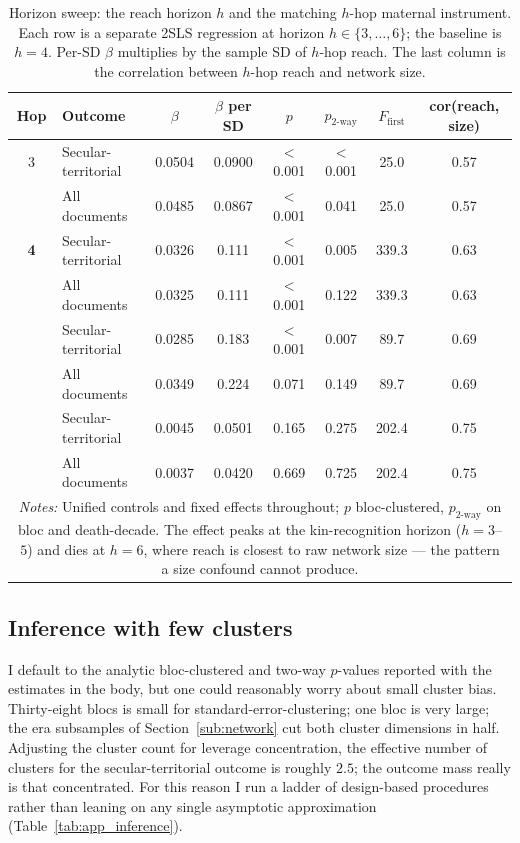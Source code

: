 \documentclass[12pt]{article}
\theoremstyle{definition}
\theoremstyle{remark}
\begin{document}
\begin{table}[t]
\centering
\caption{Horizon sweep: the reach horizon $h$ and the matching $h$-hop maternal instrument. Each row is a separate 2SLS regression at horizon $h\in\{3,\dots,6\}$; the baseline is $h=4$. Per-SD $\beta$ multiplies by the sample SD of $h$-hop reach. The last column is the correlation between $h$-hop reach and network size.}
\label{tab:app_hopsweep}
\begin{tabular}{clcccccc}
\toprule
Hop & Outcome & $\beta$ & $\beta$ per SD & $p$ & $p_{\text{2-way}}$ & $F_{\text{first}}$ & cor(reach, size) \\
\midrule
3 & Secular-territorial & 0.0504 & 0.0900 & $<$0.001 & $<$0.001 & 25.0 & 0.57 \\
 & All documents & 0.0485 & 0.0867 & $<$0.001 & 0.041 & 25.0 & 0.57 \\
\addlinespace
\textbf{4} & Secular-territorial & 0.0326 & 0.111 & $<$0.001 & 0.005 & 339.3 & 0.63 \\
 & All documents & 0.0325 & 0.111 & $<$0.001 & 0.122 & 339.3 & 0.63 \\
\addlinespace
5 & Secular-territorial & 0.0285 & 0.183 & $<$0.001 & 0.007 & 89.7 & 0.69 \\
 & All documents & 0.0349 & 0.224 & 0.071 & 0.149 & 89.7 & 0.69 \\
\addlinespace
6 & Secular-territorial & 0.0045 & 0.0501 & 0.165 & 0.275 & 202.4 & 0.75 \\
 & All documents & 0.0037 & 0.0420 & 0.669 & 0.725 & 202.4 & 0.75 \\
\midrule
\multicolumn{8}{p{0.9\textwidth}}{\footnotesize \textit{Notes:} Unified controls and fixed effects throughout; $p$ bloc-clustered, $p_{\text{2-way}}$ on bloc and death-decade. The effect peaks at the kin-recognition horizon ($h=3$--$5$) and dies at $h=6$, where reach is closest to raw network size --- the pattern a size confound cannot produce.} \\
\bottomrule
\end{tabular}
\end{table}



\subsection{Inference with few clusters}

I default to the analytic bloc-clustered and two-way $p$-values reported with the estimates in the body, but one could reasonably worry about small cluster bias. Thirty-eight blocs is small for standard-error-clustering; one bloc is very large; the era subsamples of Section~\ref{sub:network} cut both cluster dimensions in half. Adjusting the cluster count for leverage concentration, the effective number of clusters for the secular-territorial outcome is roughly $2.5$; the outcome mass really is that concentrated. For this reason I run a ladder of design-based procedures rather than leaning on any single asymptotic approximation (Table~\ref{tab:app_inference}).
\end{document}
